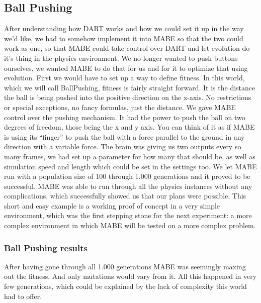 \documentclass[12pt,oneside,listof=totoc,paper=a4,headings=small]{scrbook}
\begin{document}
\subsection{Ball Pushing}
After understanding how DART works and how we could set it up in the way we'd like, we had to somehow implement it into MABE so that the two could work as one, so that MABE could take control over DART and let evolution do it's thing in the physics environment. We no longer wanted to push buttons ourselves, we wanted MABE to do that for us and for it to optimize that using evolution. First we would have to set up a way to define fitness. In this world, which we will call BallPushing, fitness is fairly straight forward. It is the distance the ball is being pushed into the positive direction on the x-axis. No restrictions or special exceptions, no fancy formulas, just the distance. We gave MABE control over the pushing mechanism. It had the power to push the ball on two degrees of freedom, those being the x and y axis. You can think of it as if MABE is using its ``finger'' to push the ball with a force parallel to the ground in any direction with a variable force. The brain was giving us two outputs every so many frames, we had set up a parameter for how many that should be, as well as simulation speed and length which could be set in the settings too. We let MABE run with a population size of 100 through 1.000 generations and it proved to be successful. MABE was able to run through all the physics instances without any complications, which successfully showed us that our plans were possible. This short and easy example is a working proof of concept in a very simple environment, which was the first stepping stone for the next experiment: a more complex environment in which MABE will be tested on a more complex problem.

\newpage

\subsubsection{Ball Pushing results}
After having gone through all 1.000 generations MABE was seemingly maxing out the fitness. And only mutations would vary from it. All this happened in very few generations, which could be explained by the lack of complexity this world had to offer.
\end{document}
